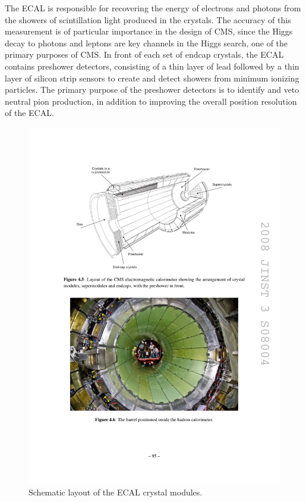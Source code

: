\indent The ECAL is responsible for recovering the energy of electrons and photons from the showers of scintillation light produced in the crystals. The accuracy of this measurement is of particular importance in the design of CMS, since the Higgs decay to photons and leptons are key channels in the Higgs search, one of the primary purposes of CMS. In front of each set of endcap crystals, the ECAL contains preshower detectors, consisting of a thin layer of lead followed by a thin layer of silicon strip sensors to create and detect showers from minimum ionizing particles. The primary purpose of the preshower detectors is to identify and veto neutral pion production, in addition to improving the overall position resolution of the ECAL.

\begin{figure}[tbh]
\centering
\includegraphics[width=5in]{figures/ecal.pdf}
\caption{Schematic layout of the ECAL crystal modules.}
\label{fig:ecal}
\end{figure}

